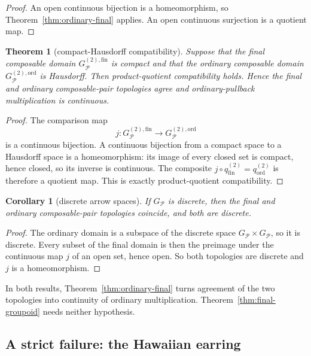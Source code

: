 \documentclass[10pt,reqno]{amsart}
\theoremstyle{definition}
\theoremstyle{plain}
\newtheorem{theorem}[definition]{Theorem}
\newtheorem{corollary}[definition]{Corollary}
\theoremstyle{remark}
\newcommand{\Fin}{\mathrm{fin}}
\newcommand{\Ord}{\mathrm{ord}}
\begin{document}
\begin{proof}
An open continuous bijection is a homeomorphism, so
Theorem~\ref{thm:ordinary-final} applies.  An open continuous surjection is a
quotient map.
\end{proof}

\begin{theorem}[compact-Hausdorff compatibility]
Suppose that the final composable domain
$G_{\mathcal P}^{(2),\Fin}$ is compact and that the ordinary composable domain
$G_{\mathcal P}^{(2),\Ord}$ is Hausdorff.  Then product-quotient compatibility
holds.  Hence the final and ordinary composable-pair topologies agree and
ordinary-pullback multiplication is continuous.
\end{theorem}

\begin{proof}
The comparison map
\[
  j:G_{\mathcal P}^{(2),\Fin}\longrightarrow
  G_{\mathcal P}^{(2),\Ord}
\]
is a continuous bijection.  A continuous bijection
from a compact space to a Hausdorff space is a homeomorphism: its image of
every closed set is compact, hence closed, so its inverse is continuous.  The
composite $j\circ q_{\Fin}^{(2)}=q_{\Ord}^{(2)}$ is therefore a quotient map.
This is exactly product-quotient compatibility.
\end{proof}

\begin{corollary}[discrete arrow spaces]
\label{cor:discrete}
If $G_{\mathcal P}$ is discrete, then the final and ordinary composable-pair
topologies coincide, and both are discrete.
\end{corollary}

\begin{proof}
The ordinary domain is a subspace of the discrete space
$G_{\mathcal P}\times G_{\mathcal P}$, so it is discrete.  Every subset of the
final domain is then the preimage under the continuous map $j$ of an open
set, hence open.  So both topologies are discrete and $j$ is a
homeomorphism.
\end{proof}

In both results, Theorem~\ref{thm:ordinary-final} turns agreement of the two
topologies into continuity of ordinary multiplication.
Theorem~\ref{thm:final-groupoid} needs neither hypothesis.

\subsection{A strict failure: the Hawaiian earring}
\end{document}
